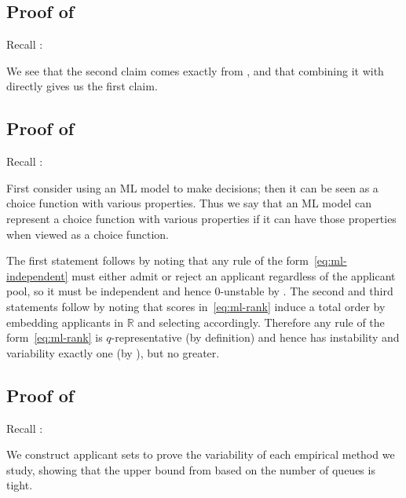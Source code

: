 \subsection{Proof of } \label{sec:variability-proof}

Recall :
\thmvariability*

We see that the second claim comes exactly from , and that combining it with  directly gives us the first claim.

\subsection{Proof of } \label{sec:ml-prop-proof}

Recall :
\mlrepresentation*

First consider using an ML model to make decisions; then it can be seen as a choice function with various properties.
Thus we say that an ML model can represent a choice function with various properties if it can have those properties when viewed as a choice function. %

The first statement follows by noting that any rule of the form~\eqref{eq:ml-independent} must either admit or reject an applicant regardless of the applicant pool, so it must be independent and hence $0$-unstable by . %
The second and third statements follow by noting that scores in~\eqref{eq:ml-rank} induce a total order by embedding applicants in $\mathbb R$ and selecting accordingly. Therefore any rule of the form~\eqref{eq:ml-rank} is $q$-representative (by definition) and hence has instability and variability exactly one (by ), but no greater.

\subsection{Proof of } \label{sec:program-prop-proof}

Recall :
\empiricalmethods*

We construct applicant sets to prove the variability of each empirical method we study, showing that the upper bound from  based on the number of queues is tight.

